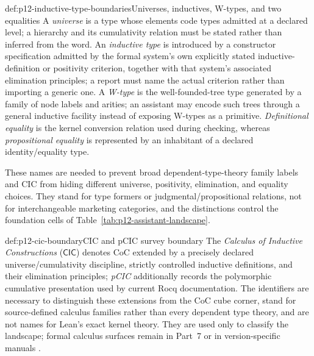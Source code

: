 \begin{hbdefinition}{def:p12-inductive-type-boundaries}{Universes, inductives, W-types, and two equalities}
A \emph{universe} is a type whose elements code types admitted at a declared
level; a hierarchy and its cumulativity relation must be stated rather than
inferred from the word.  An \emph{inductive type} is introduced by a
constructor specification admitted by the formal system's own explicitly
stated inductive-definition or positivity criterion, together with that
system's associated elimination principles; a report must name the actual
criterion rather than importing a generic one.  A \emph{W-type} is the
well-founded-tree type
generated by a family of node labels and arities; an assistant may encode such
trees through a general inductive facility instead of exposing W-types as a
primitive.  \emph{Definitional equality} is the kernel conversion relation
used during checking, whereas \emph{propositional equality} is represented by
an inhabitant of a declared identity/equality type.

These names are needed to prevent broad dependent-type-theory family labels
and CIC from hiding
different universe, positivity, elimination, and equality choices.  They stand
for type formers or judgmental/propositional relations, not for interchangeable
marketing categories, and the distinctions control the foundation cells of
Table~\ref{tab:p12-assistant-landscape}.
\end{hbdefinition}

\begin{hbdefinition}{def:p12-cic-boundary}{CIC and pCIC survey boundary}
The \emph{Calculus of Inductive Constructions} (\(\mathsf{CIC}\)) denotes
CoC extended by a precisely declared universe/cumulativity discipline,
strictly controlled inductive definitions, and their elimination principles;
\emph{pCIC} additionally records the polymorphic cumulative presentation used
by current Rocq documentation.  The identifiers are necessary to distinguish
these extensions from the CoC cube corner, stand for source-defined calculus
families rather than every dependent type theory, and are not names for Lean's
exact kernel theory.  They are used only to classify the landscape; formal
calculus surfaces remain in Part~7 or in version-specific manuals
\cite{PaulinMohring1993,PaulinMohring2015,RocqManual2026}.
\end{hbdefinition}

